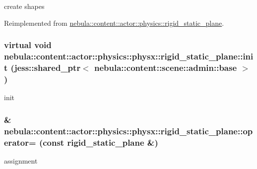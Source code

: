 create shapes 

Reimplemented from \hyperlink{classnebula_1_1content_1_1actor_1_1physics_1_1rigid__static__plane_ae711cbc9bd080a597efd1a5193756152}{nebula::content::actor::physics::rigid\_\-static\_\-plane}.\hypertarget{classnebula_1_1content_1_1actor_1_1physics_1_1physx_1_1rigid__static__plane_ad61e31b39c4591688b4a7f2cb72b5419}{
\subsubsection[{init}]{\setlength{\rightskip}{0pt plus 5cm}virtual void nebula::content::actor::physics::physx::rigid\_\-static\_\-plane::init (jess::shared\_\-ptr$<$ {\bf nebula::content::scene::admin::base} $>$)}}
\label{classnebula_1_1content_1_1actor_1_1physics_1_1physx_1_1rigid__static__plane_ad61e31b39c4591688b4a7f2cb72b5419}


init \hypertarget{classnebula_1_1content_1_1actor_1_1physics_1_1physx_1_1rigid__static__plane_a16d2723283f762b1046631cec801f211}{
\subsubsection[{operator=}]{\& nebula::content::actor::physics::physx::rigid\_\-static\_\-plane::operator= (const {\bf rigid\_\-static\_\-plane} \&)}}
\label{classnebula_1_1content_1_1actor_1_1physics_1_1physx_1_1rigid__static__plane_a16d2723283f762b1046631cec801f211}


assignment 

